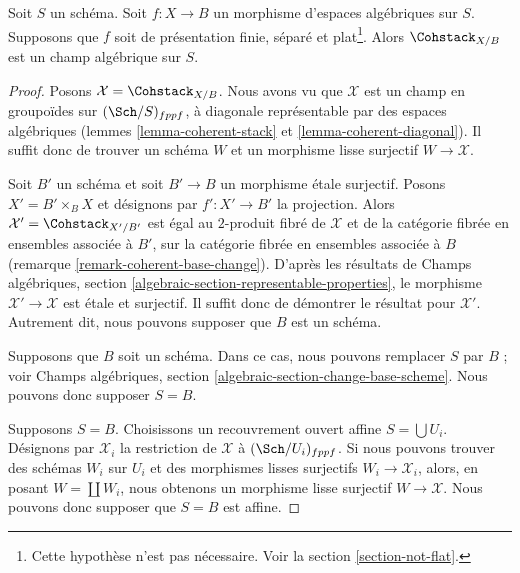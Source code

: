 \begin{theorem}
\label{theorem-coherent-algebraic}
Soit $S$ un schéma. Soit $f : X \to B$ un morphisme d'espaces algébriques sur
$S$. Supposons que $f$ soit de présentation finie, séparé et
plat\footnote{Cette hypothèse n'est pas nécessaire. Voir la section
\ref{section-not-flat}.}. Alors $\Cohstack_{X/B}$ est un champ algébrique sur
$S$.
\end{theorem}

\begin{proof}
Posons $\mathcal{X} = \Cohstack_{X/B}$. Nous avons vu que $\mathcal{X}$ est un
champ en groupoïdes sur $(\Sch/S)_{fppf}$, à diagonale représentable par des
espaces algébriques (lemmes \ref{lemma-coherent-stack} et
\ref{lemma-coherent-diagonal}). Il suffit donc de trouver un schéma $W$ et un
morphisme lisse surjectif $W \to \mathcal{X}$.

\medskip\noindent
Soit $B'$ un schéma et soit $B' \to B$ un morphisme étale surjectif. Posons
$X' = B' \times_B X$ et désignons par $f' : X' \to B'$ la projection. Alors
$\mathcal{X}' = \Cohstack_{X'/B'}$ est égal au $2$-produit fibré de
$\mathcal{X}$ et de la catégorie fibrée en ensembles associée à $B'$, sur la
catégorie fibrée en ensembles associée à $B$ (remarque
\ref{remark-coherent-base-change}). D'après les résultats de Champs
algébriques, section \ref{algebraic-section-representable-properties}, le
morphisme $\mathcal{X}' \to \mathcal{X}$ est étale et surjectif. Il suffit donc
de démontrer le résultat pour $\mathcal{X}'$. Autrement dit, nous pouvons
supposer que $B$ est un schéma.

\medskip\noindent
Supposons que $B$ soit un schéma. Dans ce cas, nous pouvons remplacer $S$ par
$B$ ; voir Champs algébriques, section
\ref{algebraic-section-change-base-scheme}. Nous pouvons donc supposer
$S = B$.

\medskip\noindent
Supposons $S = B$. Choisissons un recouvrement ouvert affine
$S = \bigcup U_i$. Désignons par $\mathcal{X}_i$ la restriction de
$\mathcal{X}$ à $(\Sch/U_i)_{fppf}$. Si nous pouvons trouver des schémas $W_i$
sur $U_i$ et des morphismes lisses surjectifs
$W_i \to \mathcal{X}_i$, alors, en posant $W = \coprod W_i$, nous obtenons un
morphisme lisse surjectif $W \to \mathcal{X}$. Nous pouvons donc supposer que
$S = B$ est affine.


\end{proof}
